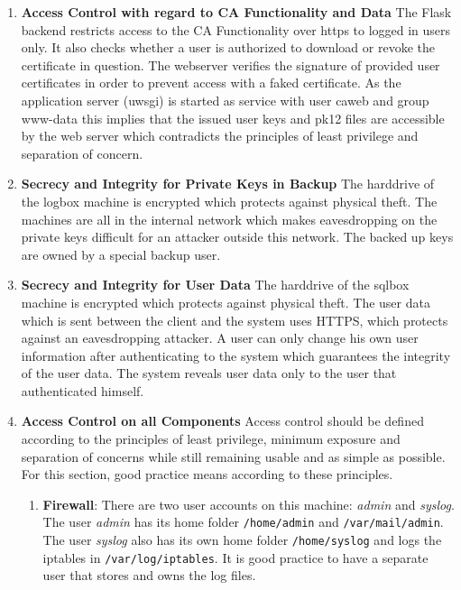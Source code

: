 \documentclass[english]{article}
\begin{document}
\begin{enumerate}

\item \textbf{Access Control with regard to CA Functionality and Data}
The Flask backend restricts access to the CA Functionality over https to logged in users only. It also checks whether a user is authorized to download or revoke the certificate in question. The webserver verifies the signature of provided user certificates in order to prevent access with a faked certificate. As the application server (uwsgi) is started as service with user caweb and group www-data this implies that the issued user keys and pk12 files are accessible by the web server which contradicts the principles of least privilege and separation of concern.

\item \textbf{Secrecy and Integrity for Private Keys in Backup}
  The harddrive of the logbox machine is encrypted which protects against physical theft. The machines are all in the internal network which makes eavesdropping on the private keys difficult for an attacker outside this network. The backed up keys are owned by a special backup user.
  
\item \textbf{Secrecy and Integrity for User Data}
  The harddrive of the sqlbox machine is encrypted which protects against physical theft. The user data which is sent between the client and the system uses HTTPS, which protects against an eavesdropping attacker. A user can only change his own user information after authenticating to the system which guarantees the integrity of the user data. The system reveals user data only to the user that authenticated himself.
\item \textbf{Access Control on all Components}
Access control should be defined according to the principles of least privilege, minimum exposure and separation of concerns while still remaining usable and as simple as possible. For this section, good practice means according to these principles.
\begin{enumerate}[label=(\alph*)]
\item \textbf{Firewall}: There are two user accounts on this machine: \textit{admin} and \textit{syslog}. The user \textit{admin} has its home folder \texttt{/home/admin} and \texttt{/var/mail/admin}. The user \textit{syslog} also has its own home folder \texttt{/home/syslog} and logs the iptables in \texttt{/var/log/iptables}. It is good practice to have a separate user that stores and owns the log files.


\end{enumerate}
\end{enumerate}
\end{document}
